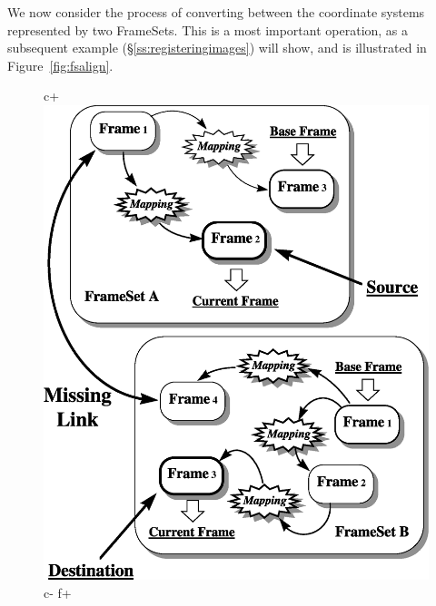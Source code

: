\documentclass[twoside,11pt]{article}
\newenvironment{latexonly}{}{}
\newcommand{\secref}[1]{\S\ref{#1}}
\newcommand{\secref}[1]{\ref{#1}}
\begin{document}
\begin{latexonly}
   We now consider the process of converting between the coordinate
   systems represented by two FrameSets. This is a most important
   operation, as a subsequent example (\secref{ss:registeringimages})
   will show, and is illustrated in Figure~\ref{fig:fsalign}.
   \begin{figure}
   \begin{center}
c+
   \includegraphics[scale=0.6]{sun211_figures/fsalign.eps}
c-
f+

\end{center}
\end{figure}
\end{latexonly}
\end{document}
